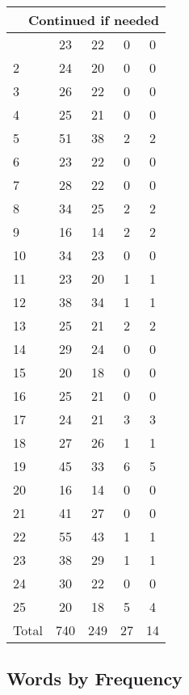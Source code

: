 \begin{center}
\begin{longtable}{l|c|c|c|c}
\hline \multicolumn{5}{|r|}{{Continued if needed}} \\ \hline
\endfoot 
1 & 23 & 22 & 0 & 0\\ \hline
2 & 24 & 20 & 0 & 0\\ \hline
3 & 26 & 22 & 0 & 0\\ \hline
4 & 25 & 21 & 0 & 0\\ \hline
5 & 51 & 38 & 2 & 2\\ \hline
6 & 23 & 22 & 0 & 0\\ \hline
7 & 28 & 22 & 0 & 0\\ \hline
8 & 34 & 25 & 2 & 2\\ \hline
9 & 16 & 14 & 2 & 2\\ \hline
10 & 34 & 23 & 0 & 0\\ \hline
11 & 23 & 20 & 1 & 1\\ \hline
12 & 38 & 34 & 1 & 1\\ \hline
13 & 25 & 21 & 2 & 2\\ \hline
14 & 29 & 24 & 0 & 0\\ \hline
15 & 20 & 18 & 0 & 0\\ \hline
16 & 25 & 21 & 0 & 0\\ \hline
17 & 24 & 21 & 3 & 3\\ \hline
18 & 27 & 26 & 1 & 1\\ \hline
19 & 45 & 33 & 6 & 5\\ \hline
20 & 16 & 14 & 0 & 0\\ \hline
21 & 41 & 27 & 0 & 0\\ \hline
22 & 55 & 43 & 1 & 1\\ \hline
23 & 38 & 29 & 1 & 1\\ \hline
24 & 30 & 22 & 0 & 0\\ \hline
25 & 20 & 18 & 5 & 4\\ \hline
\hline \hline
Total & 740 & 249 & 27 & 14



\end{longtable}
\end{center}

 
\subsection{Words by Frequency}

